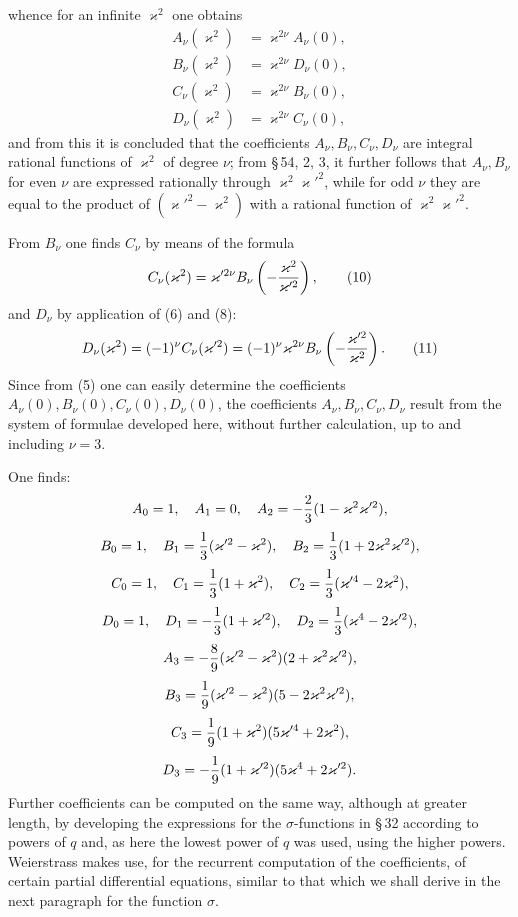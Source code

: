 \documentclass[11pt]{article}
\begin{document}
whence for an infinite $\varkappa^2$ one obtains
\begin{equation}
\begin{aligned}
A_\nu(\varkappa^2)&=\varkappa^{2\nu}A_\nu(0),\\
B_\nu(\varkappa^2)&=\varkappa^{2\nu}D_\nu(0),\\
C_\nu(\varkappa^2)&=\varkappa^{2\nu}B_\nu(0),\\
D_\nu(\varkappa^2)&=\varkappa^{2\nu}C_\nu(0),
\end{aligned}
\tag{9}
\end{equation}
and from this it is concluded that the coefficients $A_\nu,B_\nu,C_\nu,D_\nu$ are integral rational functions of $\varkappa^2$ of degree $\nu$; from \S\,54, 2, 3, it further follows that $A_\nu,B_\nu$ for even $\nu$ are expressed rationally through $\varkappa^2\varkappa'^2$, while for odd $\nu$ they are equal to the product of $(\varkappa'^2-\varkappa^2)$ with a rational function of $\varkappa^2\varkappa'^2$.

From $B_\nu$ one finds $C_\nu$ by means of the formula
\begin{equation}
C_\nu(\varkappa^2)=\varkappa'^{2\nu}B_\nu\left(-{\varkappa^2\over\varkappa'^2}\right),
\tag{10}
\end{equation}
and $D_\nu$ by application of (6) and (8):
\begin{equation}
D_\nu(\varkappa^2)=(-1)^\nu C_\nu(\varkappa'^2)=(-1)^\nu\varkappa^{2\nu}B_\nu\left(-{\varkappa'^2\over\varkappa^2}\right).
\tag{11}
\end{equation}
Since from (5) one can easily determine the coefficients $A_\nu(0),B_\nu(0),C_\nu(0),D_\nu(0)$, the coefficients $A_\nu,B_\nu,C_\nu,D_\nu$ result from the system of formulae developed here, without further calculation, up to and including $\nu=3$.

One finds:
\[
A_0=1,
\quad A_1=0,
\quad A_2=-{2\over3}(1-\varkappa^2\varkappa'^2),
\]
\[
B_0=1,
\quad B_1={1\over3}(\varkappa'^2-\varkappa^2),
\quad B_2={1\over3}(1+2\varkappa^2\varkappa'^2),
\]
\[
C_0=1,
\quad C_1={1\over3}(1+\varkappa^2),
\quad C_2={1\over3}(\varkappa'^4-2\varkappa^2),
\]
\[
D_0=1,
\quad D_1=-{1\over3}(1+\varkappa'^2),
\quad D_2={1\over3}(\varkappa^4-2\varkappa'^2),
\]
\[
A_3=-{8\over9}(\varkappa'^2-\varkappa^2)(2+\varkappa^2\varkappa'^2),
\]
\[
B_3={1\over9}(\varkappa'^2-\varkappa^2)(5-2\varkappa^2\varkappa'^2),
\]
\[
C_3={1\over9}(1+\varkappa^2)(5\varkappa'^4+2\varkappa^2),
\]
\[
D_3=-{1\over9}(1+\varkappa'^2)(5\varkappa^4+2\varkappa'^2).
\]
Further coefficients can be computed on the same way, although at greater length, by developing the expressions for the $\sigma$-functions in \S\,32 according to powers of $q$ and, as here the lowest power of $q$ was used, using the higher powers. Weierstrass makes use, for the recurrent computation of the coefficients, of certain partial differential equations, similar to that which we shall derive in the next paragraph for the function $\sigma$.
\end{document}
